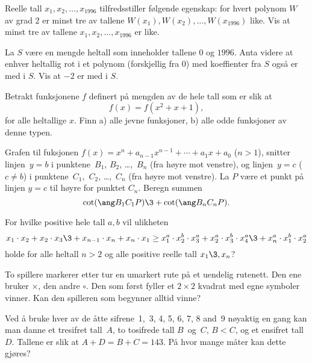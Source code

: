 \prob  %
Reelle tall $x_{1},x_{2},\ldots ,x_{1996}$ tilfredsstiller f\o{}lgende
egenskap:
for hvert polynom $W$ av grad 2 er minst tre av tallene
$W(x_{1}),W(x_{2}),\ldots ,W(x_{1996})$ like. Vis at minst tre av tallene 
$x_{1},x_{2},\ldots ,x_{1996}$ er like.


\prob  %
La $S$ v{\ae}re en mengde heltall
som inneholder tallene $0$ og $1996$.
Anta videre at enhver heltallig rot i et polynom (forskjellig fra 0) med
koeffienter fra $S$ ogs{\aa} er med i $S$. Vis at $-2$ er med i $S.$





\prob %
Betrakt funksjonene $f$ definert p{\aa} mengden av de hele tall som er slik
at 
$$f(x)=f(x^2+x+1),$$
for alle heltallige $x$. Finn a) alle jevne funksjoner,
b) alle odde funksjoner av denne typen.



\prob  %
Grafen til fuksjonen $f(x)=x^n+a_{n-1}x^{n-1}+\cdots+a_1x+a_0$ ($n>1$), 
snitter linjen~$y=b$ i punktene~$B_1$, $B_2$, \dots,~$B_n$ (fra h\o{}yre mot
venstre),
og linjen~$y=c$ ($c\ne b$) i punktene~$C_1$,~$C_2$, \dots,~$C_n$
(fra h\o{}yre mot venstre).
La $P$ v{\ae}re et punkt p{\aa} linjen $y=c$ til h\o{}yre for punktet $C_n$.
Beregn summen $$\cot(\ang B_1C_1P)\3+\cot(\ang B_nC_nP).$$



\prob   %
For hvilke positive hele tall $a,b$ vil ulikheten
$$x_1\cdot x_2+x_2\cdot x_3\3+x_{n-1}\cdot x_n+x_n\cdot x_1
    \ge x_1^a\cdot x_2^b\cdot x_3^a+x_2^a\cdot x_3^b\cdot 
        x_4^a\3+x_n^a\cdot x_1^b\cdot x_2^a$$
holde for alle heltall $n>2$ og alle positive reelle tall $x_1\3,x_n$?



\prob %
To spillere markerer etter tur en umarkert rute p{\aa} et uendelig rutenett.
Den ene bruker $\times$, den andre $\circ$. Den som f\o{}rst fyller
et $2\times 2$ kvadrat med egne symboler vinner. Kan den spilleren som  
begynner alltid vinne?


\prob %
Ved {\aa} bruke hver av de {\aa}tte sifrene~1,~3, 4, 5, 6, 7, 8 and~9 
n\o{}yaktig en gang kan man danne et tresifret tall~$A$, to tosifrede tall
$B$~og~$C$, $B<C$, og et ensifret tall~$D$. 
Tallene er slik at $A+D=B+C=143$. P{\aa} hvor mange m{\aa}ter kan dette
gj\o{}res?


